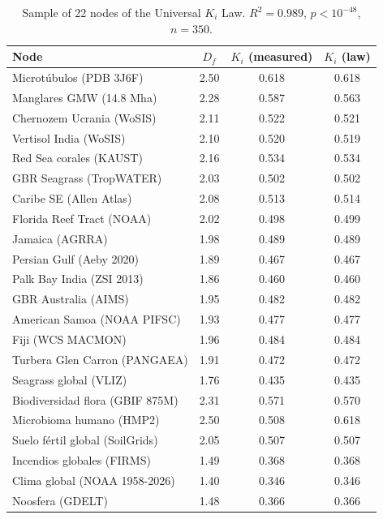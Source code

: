 \documentclass[12pt, a4paper]{article}
\theoremstyle{miuThm}
\theoremstyle{remark}
\newcommand{\Rtwo}{0.989}
\begin{document}
\begin{table}[h!]
\centering
\caption{Sample of 22 nodes of the Universal $K_i$ Law. $R^2 = \Rtwo$, $p < 10^{-48}$, $n=350$.}
\label{tab:nodos_ki_app}
\begin{tabular}{lccc}
\toprule
\textbf{Node} & \textbf{$D_f$} & \textbf{$K_i$ (measured)} & \textbf{$K_i$ (law)} \\
\midrule
Microtúbulos (PDB 3J6F) & 2.50 & 0.618 & 0.618 \\
Manglares GMW (14.8 Mha) & 2.28 & 0.587 & 0.563 \\
Chernozem Ucrania (WoSIS) & 2.11 & 0.522 & 0.521 \\
Vertisol India (WoSIS) & 2.10 & 0.520 & 0.519 \\
Red Sea corales (KAUST) & 2.16 & 0.534 & 0.534 \\
GBR Seagrass (TropWATER) & 2.03 & 0.502 & 0.502 \\
Caribe SE (Allen Atlas) & 2.08 & 0.513 & 0.514 \\
Florida Reef Tract (NOAA) & 2.02 & 0.498 & 0.499 \\
Jamaica (AGRRA) & 1.98 & 0.489 & 0.489 \\
Persian Gulf (Aeby 2020) & 1.89 & 0.467 & 0.467 \\
Palk Bay India (ZSI 2013) & 1.86 & 0.460 & 0.460 \\
GBR Australia (AIMS) & 1.95 & 0.482 & 0.482 \\
American Samoa (NOAA PIFSC) & 1.93 & 0.477 & 0.477 \\
Fiji (WCS MACMON) & 1.96 & 0.484 & 0.484 \\
Turbera Glen Carron (PANGAEA) & 1.91 & 0.472 & 0.472 \\
Seagrass global (VLIZ) & 1.76 & 0.435 & 0.435 \\
Biodiversidad flora (GBIF 875M) & 2.31 & 0.571 & 0.570 \\
Microbioma humano (HMP2) & 2.50 & 0.508 & 0.618 \\
Suelo fértil global (SoilGrids) & 2.05 & 0.507 & 0.507 \\
Incendios globales (FIRMS) & 1.49 & 0.368 & 0.368 \\
Clima global (NOAA 1958-2026) & 1.40 & 0.346 & 0.346 \\
Noosfera (GDELT) & 1.48 & 0.366 & 0.366 \\
\bottomrule
\end{tabular}
\end{table}
\end{document}
